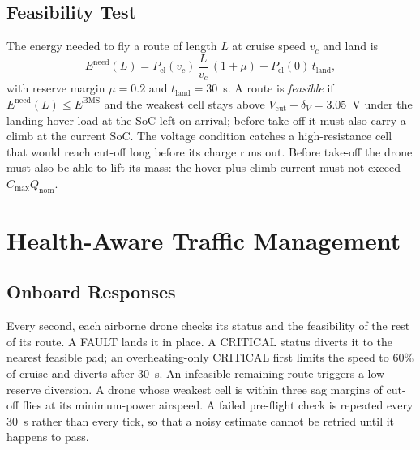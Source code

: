 \documentclass[journal]{IEEEtran}
\newcommand{\Ebms}{E^{\mathrm{BMS}}}
\newcommand{\Eneed}{E^{\mathrm{need}}}
\begin{document}
\subsection{Feasibility Test}
The energy needed to fly a route of length $L$ at cruise speed $v_c$ and land is
\begin{equation}
\Eneed(L) = P_{\mathrm{el}}(v_c)\,\frac{L}{v_c}\,(1 + \mu) + P_{\mathrm{el}}(0)\, t_{\mathrm{land}},
\end{equation}
with reserve margin $\mu = 0.2$ and $t_{\mathrm{land}} = 30$~s. A route is \emph{feasible} if $\Eneed(L) \le \Ebms$ and the weakest cell stays above $V_{\mathrm{cut}} + \delta_V = 3.05$~V under the landing-hover load at the SoC left on arrival; before take-off it must also carry a climb at the current SoC. The voltage condition catches a high-resistance cell that would reach cut-off long before its charge runs out. Before take-off the drone must also be able to lift its mass: the hover-plus-climb current must not exceed $C_{\max} Q_{\mathrm{nom}}$.

\section{Health-Aware Traffic Management}\label{sec:health}

\subsection{Onboard Responses}
Every second, each airborne drone checks its status and the feasibility of the rest of its route. A FAULT lands it in place. A CRITICAL status diverts it to the nearest feasible pad; an overheating-only CRITICAL first limits the speed to 60\% of cruise and diverts after 30~s. An infeasible remaining route triggers a low-reserve diversion. A drone whose weakest cell is within three sag margins of cut-off flies at its minimum-power airspeed. A failed pre-flight check is repeated every 30~s rather than every tick, so that a noisy estimate cannot be retried until it happens to pass.
\end{document}
